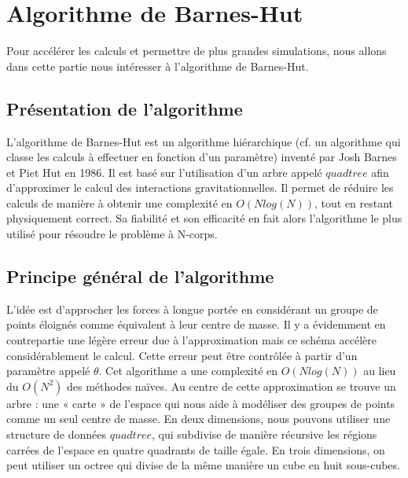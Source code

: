 \chapter{Algorithme de Barnes-Hut}

Pour accélérer les calculs et permettre de plus grandes simulations, nous allons dans cette partie nous intéresser à l’algorithme de Barnes-Hut.

\section{Présentation de l'algorithme}

L'algorithme de Barnes-Hut est un algorithme hiérarchique (cf. un algorithme qui classe les calculs à effectuer en fonction d'un paramètre) inventé par Josh Barnes et Piet Hut en 1986. Il est basé sur l'utilisation d'un arbre appelé $quadtree$ afin d'approximer le calcul des  interactions gravitationnelles. Il permet de réduire les calculs de manière à obtenir une complexité en $O(Nlog(N))$, tout en restant physiquement correct. Sa fiabilité et son efficacité en fait alors l'algorithme le plus utilisé pour résoudre le problème à N-corps.
 
\section{Principe général de l'algorithme}

L'idée est d'approcher les forces à longue portée en considérant un groupe de points éloignés comme équivalent à leur centre de masse. Il y a évidemment en contrepartie une légère erreur due à l'approximation mais ce schéma accélère considérablement le calcul. Cette erreur peut être contrôlée à partir d'un paramètre appelé $\theta$. Cet algorithme a une complexité en $O(Nlog(N))$ au lieu du $O(N^2)$ des méthodes naïves.
Au centre de cette approximation se trouve un arbre : une « carte » de l'espace qui nous aide à modéliser des groupes de points comme un seul centre de masse. En deux dimensions, nous pouvons utiliser une structure de données $\textit{quadtree}$, qui subdivise de manière récursive les régions carrées de l'espace en quatre quadrants de taille égale. En trois dimensions, on peut utiliser un octree qui divise de la même manière un cube en huit sous-cubes.


